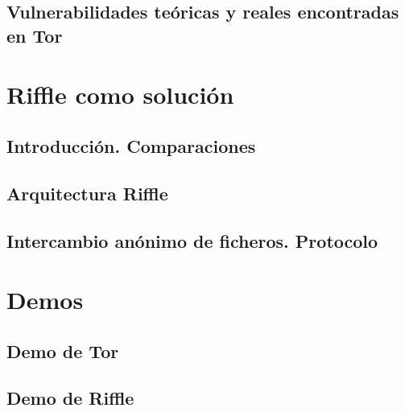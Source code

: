 \documentclass[a4paper,twocolumn,10pt]{article}
\begin{document}
\subsection{Vulnerabilidades teóricas y reales encontradas en Tor}

	
\newpage

\section{Riffle como solución}
\subsection{Introducción. Comparaciones}

\subsection{Arquitectura Riffle}

\newpage

\subsection{Intercambio anónimo de ficheros. Protocolo}

	

\newpage

\section{Demos}
\subsection{Demo de Tor}
	
\subsection{Demo de Riffle}

\clearpage
	
\end{document}
